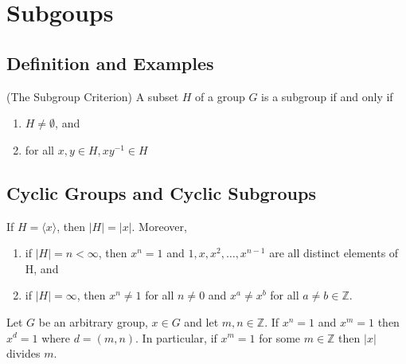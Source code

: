 \documentclass[../main]{subfiles}
\begin{document}
 
 \section{Subgoups}
 
 \subsection{Definition and Examples}
 
 \begin{prop}
  (The Subgroup Criterion) A subset $H$ of a group $G$ is a subgroup if and only if 
  \begin{enumerate}
   \item $H\neq \emptyset$, and 
   \item for all $x,y \in H, xy^{-1}\in H$
  \end{enumerate}
 \end{prop}
 
 \setcounter{subsection}{+2}

 \subsection{Cyclic Groups and Cyclic Subgroups}
 
 \begin{prop}
  If $H=\langle x\rangle$, then $|H|=|x|$. Moreover,
  \begin{enumerate}
   \item if $|H| = n < \infty $, then $x^n = 1$ and $1,x,x^2,\ldots,x^{n-1}$ are all distinct elements of H, and 
   \item if $|H|= \infty$, then $x^n \neq 1$ for all $n \neq 0$ and $x^a \neq x^b$ for all $a\neq b \in \mathbb{Z}$.
  \end{enumerate}
 \end{prop}
 
 
 \begin{prop}
  Let $G$ be an arbitrary group, $x\in G$ and let $m,n \in \mathbb{Z}$. If $x^n = 1$ and $x^m = 1$ then $x^d = 1$ where $d=(m,n)$. In particular, if $x^m=1$ for some $m\in \mathbb{Z}$ then $|x|$ divides $m$.
 \end{prop}
 
\end{document}
